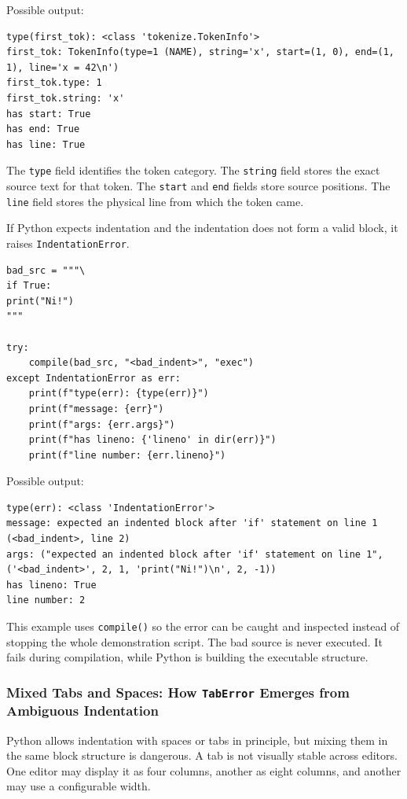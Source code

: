 \documentclass[a4paper,twoside]{report}
\begin{document}
Possible output:

\begin{verbatim}
type(first_tok): <class 'tokenize.TokenInfo'>
first_tok: TokenInfo(type=1 (NAME), string='x', start=(1, 0), end=(1, 1), line='x = 42\n')
first_tok.type: 1
first_tok.string: 'x'
has start: True
has end: True
has line: True
\end{verbatim}

The \texttt{type} field identifies the token category. The \texttt{string} field stores the exact source text for that token. The \texttt{start} and \texttt{end} fields store source positions. The \texttt{line} field stores the physical line from which the token came.

If Python expects indentation and the indentation does not form a valid block, it raises \texttt{IndentationError}.

\begin{verbatim}
bad_src = """\
if True:
print("Ni!")
"""

try:
    compile(bad_src, "<bad_indent>", "exec")
except IndentationError as err:
    print(f"type(err): {type(err)}")
    print(f"message: {err}")
    print(f"args: {err.args}")
    print(f"has lineno: {'lineno' in dir(err)}")
    print(f"line number: {err.lineno}")
\end{verbatim}

Possible output:

\begin{verbatim}
type(err): <class 'IndentationError'>
message: expected an indented block after 'if' statement on line 1 (<bad_indent>, line 2)
args: ("expected an indented block after 'if' statement on line 1", ('<bad_indent>', 2, 1, 'print("Ni!")\n', 2, -1))
has lineno: True
line number: 2
\end{verbatim}

This example uses \texttt{compile()} so the error can be caught and inspected instead of stopping the whole demonstration script. The bad source is never executed. It fails during compilation, while Python is building the executable structure.

\subsubsection{Mixed Tabs and Spaces: How \texttt{TabError} Emerges from Ambiguous Indentation}

Python allows indentation with spaces or tabs in principle, but mixing them in the same block structure is dangerous. A tab is not visually stable across editors. One editor may display it as four columns, another as eight columns, and another may use a configurable width.
\end{document}
